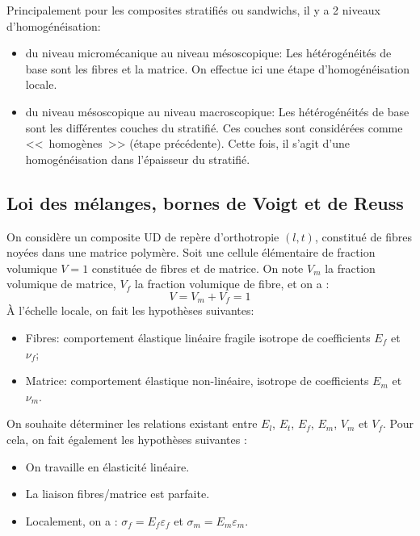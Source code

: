 \medskip
Principalement pour les composites stratifiés ou sandwichs, il y a 2 niveaux d'homogénéisation:
\begin{itemize}
	\item du niveau micromécanique au niveau mésoscopique:
		Les hétérogénéités de base sont les fibres et la matrice. On effectue ici
		 une étape d'homogénéisation locale.
	\item du niveau mésoscopique au niveau macroscopique:
		Les hétérogénéités de base sont les différentes couches du stratifié.
		 Ces couches sont considérées comme <<~homogènes~>> (étape précédente).
		 Cette fois, il s'agit d'une homogénéisation dans l'épaisseur du stratifié.
\end{itemize}





\medskip
\subsection{Loi des mélanges, bornes de Voigt et de Reuss}

On considère un composite UD de repère d'orthotropie $(l,t)$, constitué de fibres noyées dans
une matrice polymère. Soit une cellule élémentaire de fraction volumique $V = 1$ constituée de
fibres et de matrice. On note
$V_m$ la fraction volumique de matrice,
$V_f$ la fraction volumique de fibre, et on a :
\begin{equation} V = V_m + V_f =1 \end{equation}
\medskip
À l'échelle locale, on fait les hypothèses suivantes:
\begin{itemize}
   \item Fibres: comportement élastique linéaire fragile isotrope de coefficients $E_f$ et $\nu_f$;
   \item Matrice: comportement élastique non-linéaire, isotrope de coefficients $E_m$ et $\nu_m$.
\end{itemize}
\medskip
On souhaite déterminer les relations existant entre $E_l$, $E_t$, $E_f$, $E_m$, $V_m$ et $V_f$.
\medskip
Pour cela, on fait également les hypothèses suivantes :
\begin{itemize}
   \item On travaille en élasticité linéaire.
   \item La liaison fibres/matrice est parfaite.
   \item Localement, on a : $\sigma_f = E_f \varepsilon_f$  et $\sigma_m = E_m \varepsilon_m$.
\end{itemize}

